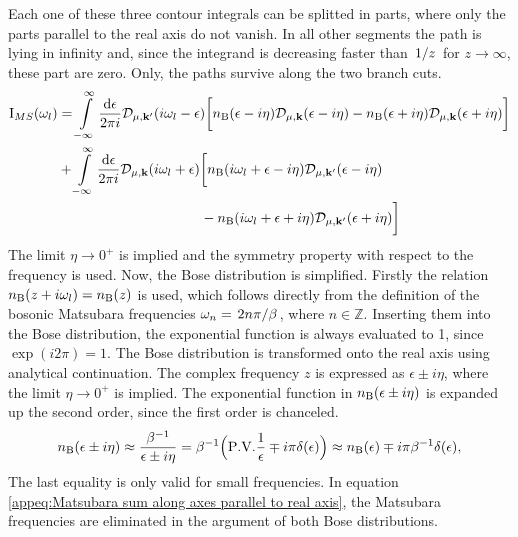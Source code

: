 Each one of these three contour integrals can be splitted in parts, where only the parts parallel to the real axis do not vanish.
In all other segments the path is lying in infinity and, since the integrand is decreasing faster than $\flatfrac{1}{z}$ for $z \to \infty$, these part are zero.
Only, the paths survive along the two branch cuts.
%
\begin{align}
	\mt{I}_{MS}(\omega_{l}) &= 
		\int\limits_{-\infty}^{\infty} \frac{\dd{\epsilon}}{2\pi i} 
			\mathcal{D}_{\mu,\vb{k}'}(i\omega_{l}-\epsilon)
			\bigg[
				n_{\mt{B}}(\epsilon - i\eta) 
				\mathcal{D}_{\mu,\vb{k}}(\epsilon - i\eta) 
				- 
				n_{\mt{B}}(\epsilon + i\eta) 
				\mathcal{D}_{\mu,\vb{k}}(\epsilon + i\eta)
			\bigg]
		\notag \\ &+
		\int\limits_{-\infty}^{\infty} \frac{\dd{\epsilon}}{2\pi i} 
			\mathcal{D}_{\mu,\vb{k}}(i\omega_{l} + \epsilon)
			\bigg[
				n_{\mt{B}}(i\omega_{l} + \epsilon - i\eta)  
				\mathcal{D}_{\mu,\vb{k}'}(\epsilon - i\eta) 
				\notag \\& \hspace{3.6cm}- 
				n_{\mt{B}}(i\omega_{l} + \epsilon + i\eta)
				\mathcal{D}_{\mu,\vb{k}'}(\epsilon + i\eta)
			\bigg]
	\label{appeq:Matsubara sum along axes parallel to real axis}
\end{align}
%
The limit $\eta \to 0^{+}$ is implied and the symmetry property with respect to the frequency is used.
Now, the Bose distribution is simplified.
Firstly the relation $n_{\mathrm{B}}(z+i\omega_{l}) = n_{\mathrm{B}}(z)$ is used, which follows directly from the definition of the bosonic Matsubara frequencies $\omega_{n} = \flatfrac{2n\pi}{\beta}$, where $n\in\mathbb{Z}$.
Inserting them into the Bose distribution, the exponential function is always evaluated to 1, since $\exp(i2\pi) = 1$.
The Bose distribution is transformed onto the real axis using analytical continuation.
The complex frequency $z$ is expressed as $\epsilon \pm i\eta$, where the limit $\eta \to 0^+$ is implied.
The exponential function in $n_{\mathrm{B}}(\epsilon \pm i\eta)$ is expanded up the second order, since the first order is chanceled.
%
\begin{align}
	n_{\mt{B}}(\epsilon \pm i\eta) \approx \frac{\beta^{-1}}{\epsilon \pm i\eta} = \beta^{-1} \Big( \PV{\frac{1}{\epsilon}} \mp i\pi\delta(\epsilon) \Big) \approx n_{\mt{B}}(\epsilon) \mp i\pi \beta^{-1} \delta(\epsilon),
	\label{appeq:Bose distribution in real and imaginary part}
\end{align}
%
The last equality is only valid for small frequencies.
In equation \eqref{appeq:Matsubara sum along axes parallel to real axis}, the Matsubara frequencies are eliminated in the argument of both Bose distributions.
